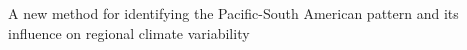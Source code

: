 A new method for identifying the Pacific-South American pattern and its influence on regional climate variability